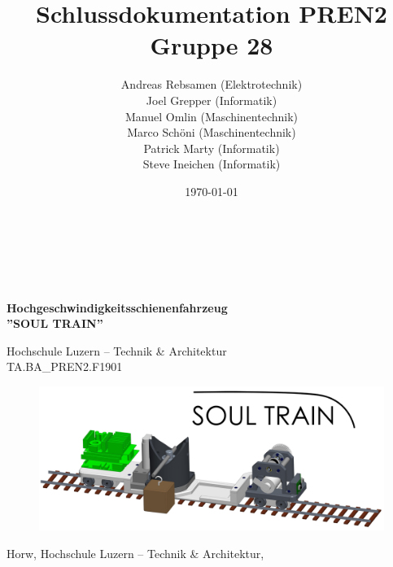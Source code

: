 \documentclass[11pt]{scrartcl}
\title{Schlussdokumentation PREN2 Gruppe 28}
\author{Andreas Rebsamen (Elektrotechnik) \\Joel Grepper (Informatik)\\ Manuel Omlin (Maschinentechnik)\\ Marco Schöni (Maschinentechnik)\\ Patrick Marty (Informatik)\\ Steve Ineichen (Informatik)}
\date{\today{}}
\begin{document}
    \begin{titlingpage}
        \begin{flushleft}
            \begin{Huge} %
                \textbf{\thetitle} \\
            \end{Huge}
            \vspace{1.5cm}
            \begin{large} %
                \theauthor \\
            \end{large}
            \vspace{1.5cm}
            \begin{huge}
                \textbf{Hochgeschwindigkeitsschienenfahrzeug}\\
                \textbf{''SOUL TRAIN''}\\
            \end{huge}
            \vspace{0.5cm}
            \begin{large}
                Hochschule Luzern – Technik \& Architektur\\
                TA.BA{\_}PREN2.F1901
            \end{large}
            \vspace{1.5cm}
            \begin{figure}[H] %
                \centering
                \includegraphics[width=1\textwidth]{images/soultrain.png}
            \end{figure}
            \vspace{3cm}
            \begin{large} %
                Horw, Hochschule Luzern – Technik \& Architektur, \thedate
            \end{large}
        \end{flushleft}
    \end{titlingpage}
\end{document}
